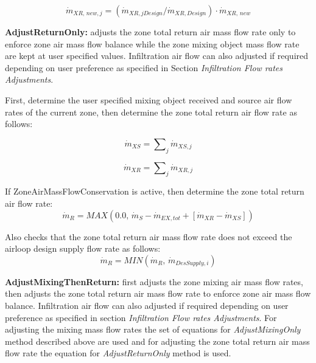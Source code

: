 \begin{equation}
{\dot m_{XR,\,new,j}} = \left( {{{\dot m}_{XR,jDesign}}/{{\dot m}_{XR,Design}}} \right) \cdot {\dot m_{XR,\,new}}
\end{equation}

\textbf{AdjustReturnOnly:} adjusts the zone total return air mass flow rate only to enforce zone air mass flow balance while the zone mixing object mass flow rate are kept at user specified values. Infiltration air flow can also adjusted if required depending on user preference as specified in Section \textit{Infiltration Flow rates Adjustments}.

First, determine the user specified mixing object received and source air flow rates of the current zone, then determine the zone total return air flow rate as follows:

\begin{equation}
{\dot m_{XS}} = \sum\nolimits_j {{{\dot m}_{XS,j}}}
\end{equation}

\begin{equation}
{\dot m_{XR}} = \sum\nolimits_j {{{\dot m}_{XR,j}}}
\end{equation}

If ZoneAirMassFlowConservation is active, then determine the zone total return air flow rate:
\begin{equation}
{\dot m_{R}} = MAX\left( {0.0,\,{{\dot m}_S} - {{\dot m}_{EX,tot}} + [{{\dot m}_{XR}} - {{\dot m}_{XS}}]} \right)
\end{equation}

Also checks that the zone total return air mass flow rate does not exceed the airloop design supply flow rate as follows:
\begin{equation}
{\dot m_{R}} = MIN\left( {{\dot m_{R}},\,{{\dot m}_{DesSupply,i}}} \right) 
\end{equation}

\textbf{AdjustMixingThenReturn:} first adjusts the zone mixing air mass flow rates, then adjusts the zone total return air mass flow rate to enforce zone air mass flow balance. Infiltration air flow can also adjusted if required depending on user preference as specified in section \textit{Infiltration Flow rates Adjustments}. For adjusting the mixing mass flow rates the set of equations for \textit{AdjustMixingOnly} method described above are used and for adjusting the zone total return air mass flow rate the equation for \textit{AdjustReturnOnly} method is used. 

